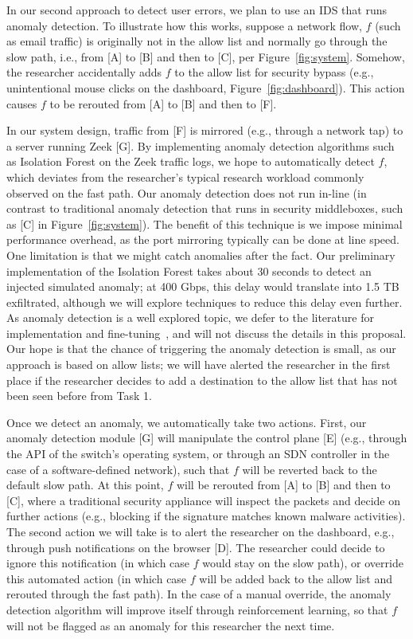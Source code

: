 In our second approach to detect user errors, we plan to use an IDS that runs anomaly detection. To illustrate how this works, suppose a network flow, $f$ (such as email traffic) is originally not in the allow list and normally go through the slow path, i.e., from [A] to [B] and then to [C], per Figure~\ref{fig:system}. Somehow, the researcher accidentally adds $f$ to the allow list for security bypass (e.g., unintentional mouse clicks on the dashboard, Figure~\ref{fig:dashboard}). This action causes $f$ to be rerouted from [A] to [B] and then to [F].

In our system design, traffic from [F] is mirrored (e.g., through a network tap) to a server running Zeek [G]. By implementing anomaly detection algorithms such as Isolation Forest on the Zeek traffic logs, we hope to automatically detect $f$, which deviates from the researcher's typical research workload commonly observed on the fast path. Our anomaly detection does not run in-line (in contrast to traditional anomaly detection that runs in security middleboxes, such as [C] in Figure~\ref{fig:system}). The benefit of this technique is we impose minimal performance overhead, as the port mirroring typically can be done at line speed. One limitation is that we might catch anomalies after the fact. Our preliminary implementation of the Isolation Forest takes about 30 seconds to detect an injected simulated anomaly; at 400 Gbps, this delay would translate into 1.5 TB exfiltrated, although we will explore techniques to reduce this delay even further. As anomaly detection is a well explored topic, we defer to the literature for implementation and fine-tuning~\cite{barradas2021flowlens}, and will not discuss the details in this proposal. Our hope is that the chance of triggering the anomaly detection is small, as our approach is based on allow lists;  we will have alerted the researcher in the first place if the researcher decides to add a destination to the allow list that has not been seen before from Task 1.

Once we detect an anomaly, we automatically take two actions. First, our anomaly detection module [G] will manipulate the control plane [E] (e.g., through the API of the switch's operating system, or through an SDN controller in the case of a software-defined network), such that $f$ will be reverted back to the default slow path. At this point, $f$ will be rerouted from [A] to [B] and then to [C], where a traditional security appliance will inspect the packets and decide on further actions (e.g., blocking if the signature matches known malware activities). The second action we will take is to alert the researcher on the dashboard, e.g., through push notifications on the browser [D]. The researcher could decide to ignore this notification (in which case $f$ would stay on the slow path), or override this automated action (in which case $f$ will be added back to the allow list and rerouted through the fast path). In the case of a manual override, the anomaly detection algorithm will improve itself through reinforcement learning, so that $f$ will not be flagged as an anomaly for this researcher the next time.

